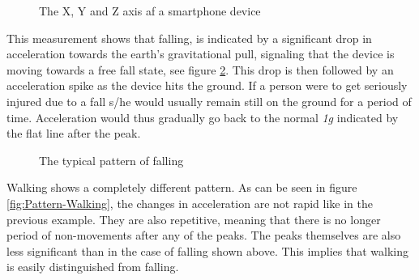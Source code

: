 \documentclass[12pt, a4paper, onecolumn]{article}
\begin{document}
	\begin{figure}[H]
		\centering
		\caption{The X, Y and Z axis af a smartphone device}%
		\label{fig:XYZ-Axis}%
	\end{figure}
	
	This measurement shows that falling, is indicated by a significant drop in acceleration towards the earth's gravitational pull, signaling that the device is moving towards a free fall state, see figure \ref{fig:Pattern-Falling}. This drop is then followed by an acceleration spike as the device hits the ground. If a person were to get seriously injured due to a fall s/he would usually remain still on the ground for a period of time. Acceleration would thus gradually go back to the normal \textit{1g} indicated by the flat line after the peak. 
	
	\begin{figure}[H]
		\centering
		\caption{The typical pattern of falling}%
		\label{fig:Pattern-Falling}%
	\end{figure}
	
	
	Walking shows a completely different pattern. As can be seen in figure \ref{fig:Pattern-Walking}, the changes in acceleration are not rapid like in the previous example. They are also repetitive, meaning that there is no longer period of non-movements after any of the peaks. The peaks themselves are also less significant than in the case of falling shown above. This implies that walking is easily distinguished from falling.
	
\end{document}
